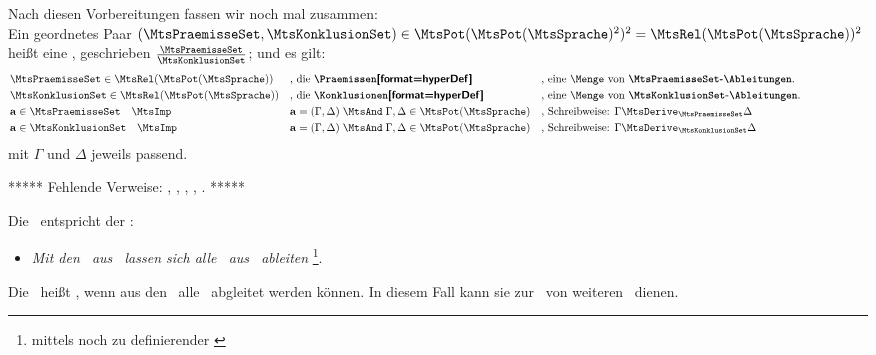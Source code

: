 Nach diesen Vorbereitungen fassen wir noch mal zusammen:\\
Ein geordnetes Paar $(\MtsPraemisseSet, \MtsKonklusionSet) \in \MtsPotAllDerive^2 = \MtsRelAllDerive^2$ heißt eine
  \MtsSprache, geschrieben $\frac{\MtsPraemisseSet}{\MtsKonklusionSet}$; und es gilt:
\begin{align}
	& \MtsPraemisseSet \in \MtsRelAllDerive
	&& \text{, die \defTxt{\Praemissen}}
	&& \text{, eine \Menge\ von \defFt{\MtsPraemisseSet-\Ableitungen}.}
	\label{def:ruleRelationPraemissen}
	\\
	& \MtsKonklusionSet   \in \MtsRelAllDerive
	&& \text{, die \defTxt{\Konklusionen}}
	&& \text{, eine \Menge\ von   \defFt{\MtsKonklusionSet-\Ableitungen}.}
	\label{def:ruleRelationKonklusionen}
	\\
	& \drvFt{a} \in \MtsPraemisseSet \quad \MtsImp
	&& \drvFt{a} = (\Gamma, \Delta) \; \MtsAnd \; \Gamma, \Delta \in \MtsPotSprache
	&& \text{, Schreibweise: } \Gamma \MtsDerive_{\MtsPraemisseSet} \Delta
	\\
	& \drvFt{a} \in \MtsKonklusionSet \quad \MtsImp
	&& \drvFt{a} = (\Gamma, \Delta) \; \MtsAnd \; \Gamma, \Delta \in \MtsPotSprache
	&& \text{, Schreibweise: } \Gamma \MtsDerive_{\MtsKonklusionSet} \Delta
	\formulatoleft
\end{align}
mit $\Gamma$ und $\Delta$ jeweils passend.

***** Fehlende Verweise: \Ableitungsmenge, \OjkEqN, \MtsTrue, \MtsDerive, \MtsDeriveR. *****

Die \Schlussregel\ entspricht der \Aussage:
\begin{itemize}
	\item[] \emph{Mit den \Praemissen\ aus \MtsPraemisseSet\ lassen sich alle \Konklusionen\ aus \MtsKonklusionSet\ ableiten}%
	\footnote{mittels noch zu definierender \emph{\zulaessigerTransformationen}}.
\end{itemize}
Die \Schlussregel\ heißt , wenn aus den \Praemissen\ alle \Konklusionen\ abgleitet werden können.
In diesem Fall kann sie zur \zulaessigenTransformation\ von weiteren \Formeln\ dienen.

